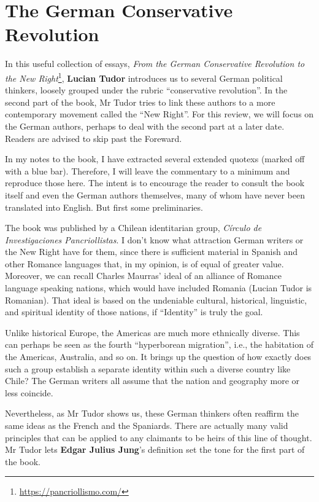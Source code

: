 \section{The German Conservative Revolution}

In this useful collection of essays, \textit{From the German Conservative Revolution to the New Right}\footnote{\url{https://pancriollismo.com/}}, \textbf{Lucian Tudor}
introduces us to several German political thinkers, loosely grouped under the rubric “conservative revolution”. In the
second part of the book, Mr Tudor tries to link these authors to a more contemporary movement called the “New Right”.
For this review, we will focus on the German authors, perhaps to deal with the second part at a later date. Readers are
advised to skip past the Foreward.

In my notes to the book, I have extracted several extended quotexs (marked off with a blue bar). Therefore, I will
leave the commentary to a minimum and reproduce those here. The intent is to encourage the reader to consult the book
itself and even the German authors themselves, many of whom have never been translated into English. But first some
preliminaries.

The book was published by a Chilean identitarian group, \emph{Círculo de Investigaciones Pancriollistas}. I
don't know what attraction German writers or the New Right have for them, since there is sufficient
material in Spanish and other Romance languages that, in my opinion, is of equal of greater value. Moreover, we can
recall Charles Maurras' ideal of an alliance of Romance language speaking nations, which would have
included Romania (Lucian Tudor is Romanian). That ideal is based on the undeniable cultural, historical, linguistic,
and spiritual identity of those nations, if “Identity” is truly the goal.

Unlike historical Europe, the Americas are much more ethnically diverse. This can perhaps be seen as the fourth
“hyperborean migration”, i.e., the habitation of the Americas, Australia, and so on. It brings up the question of how
exactly does such a group establish a separate identity within such a diverse country like Chile? The German writers
all assume that the nation and geography more or less coincide.

Nevertheless, as Mr Tudor shows us, these German thinkers often reaffirm the same ideas as the French and the Spaniards.
There are actually many valid principles that can be applied to any claimants to be heirs of this line of thought. Mr
Tudor lets \textbf{Edgar Julius Jung}'s definition set the tone for the first part of the book.

